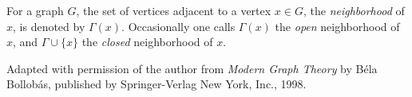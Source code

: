 \documentclass{article}
\begin{document}
For a graph $G$, the set of vertices adjacent to a vertex $x \in G$, the \emph{neighborhood} of $x$, is denoted by $\Gamma(x)$. Occasionally one calls $\Gamma(x)$ the \emph{open} neighborhood of $x$, and $\Gamma \cup \{x\}$ the \emph{closed} neighborhood of $x$.


\footnotesize{Adapted with permission of the author from \emph{Modern Graph Theory} by B\'{e}la Bollob\'{a}s, published by Springer-Verlag New York, Inc., 1998.}
\end{document}
